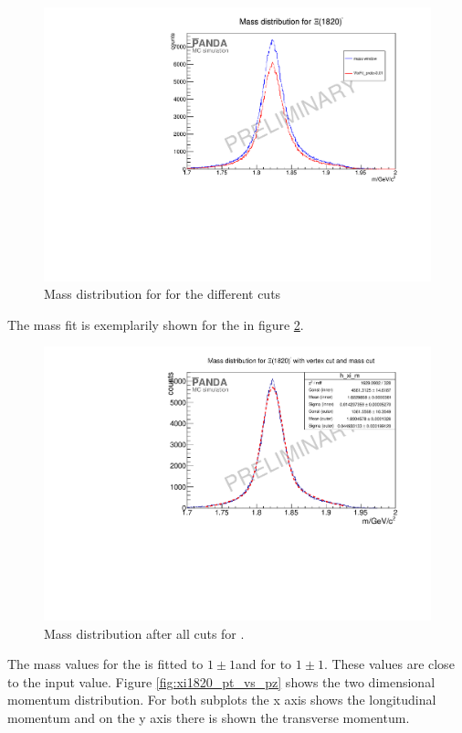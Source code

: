 	\begin{figure}
		\centering
		\includegraphics[width=1.\textwidth]{./plots/Xi1820/XiMinus1820_m_diffcuts.pdf}
		\caption{\propose Mass distribution for \excitedcascade for the different cuts}
		\label{fig:xi1820_mass_diffcuts}
	
	\end{figure}
	The mass fit is exemplarily shown for the \excitedcascade in figure \ref{fig:xi1820_massfit}. 
	
	\begin{figure}
		\centering
		\includegraphics[width=1.\textwidth]{./plots/Xi1820/XiMinus1820_m_masscut.pdf}
		\caption{\propose Mass distribution after all cuts for \excitedcascade.}
		\label{fig:xi1820_massfit}
	\end{figure}
	The mass values for the \excitedcascade is fitted to $1 \pm 1$\massunit and for \excitedanticascade to $1 \pm 1 $\massunit.
	These values are close to the input value.
	Figure \ref{fig:xi1820_pt_vs_pz} shows the two dimensional momentum distribution. For both subplots the x axis shows the longitudinal momentum
	and on the y axis there is shown the transverse momentum.
	
